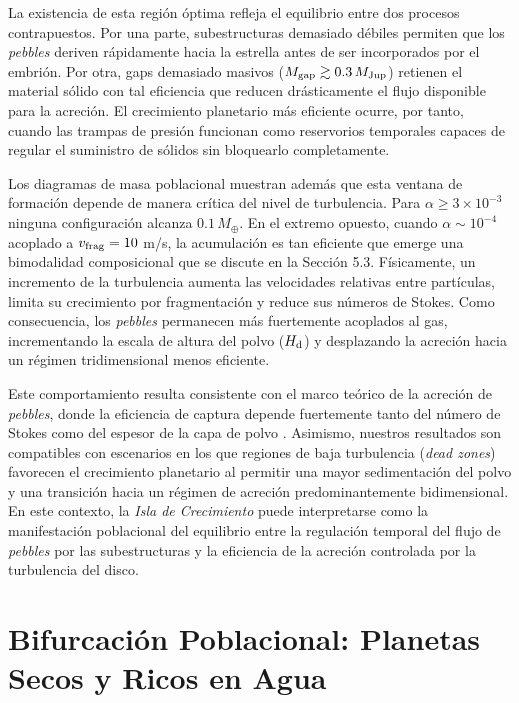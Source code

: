 La existencia de esta región óptima refleja el equilibrio entre dos procesos contrapuestos. Por una parte, subestructuras demasiado débiles permiten que los \textit{pebbles} deriven rápidamente hacia la estrella antes de ser incorporados por el embrión. Por otra, gaps demasiado masivos ($M_{\rm gap}\gtrsim0.3\,M_{\rm Jup}$) retienen el material sólido con tal eficiencia que reducen drásticamente el flujo disponible para la acreción. El crecimiento planetario más eficiente ocurre, por tanto, cuando las trampas de presión funcionan como reservorios temporales capaces de regular el suministro de sólidos sin bloquearlo completamente.

Los diagramas de masa poblacional muestran además que esta ventana de formación depende de manera crítica del nivel de turbulencia. Para $\alpha\ge3\times10^{-3}$ ninguna configuración alcanza $0.1\,M_\oplus$. 
En el extremo opuesto, cuando $\alpha \sim 10^{-4}$ acoplado a $v_{\rm frag} = 10$ m/s, 
la acumulación es tan eficiente que emerge una bimodalidad composicional 
que se discute en la Sección 5.3. Físicamente, un incremento de la turbulencia aumenta las velocidades relativas entre partículas, limita su crecimiento por fragmentación y reduce sus números de Stokes. Como consecuencia, los \textit{pebbles} permanecen más fuertemente acoplados al gas, incrementando la escala de altura del polvo ($H_{\rm d}$) y desplazando la acreción hacia un régimen tridimensional menos eficiente.

Este comportamiento resulta consistente con el marco teórico de la acreción de \textit{pebbles}, donde la eficiencia de captura depende fuertemente tanto del número de Stokes como del espesor de la capa de polvo \citep{Bitsch2015,Ataiee2018}. Asimismo, nuestros resultados son compatibles con escenarios en los que regiones de baja turbulencia (\textit{dead zones}) favorecen el crecimiento planetario al permitir una mayor sedimentación del polvo y una transición hacia un régimen de acreción predominantemente bidimensional. En este contexto, la \textit{Isla de Crecimiento} puede interpretarse como la manifestación poblacional del equilibrio entre la regulación temporal del flujo de \textit{pebbles} por las subestructuras y la eficiencia de la acreción controlada por la turbulencia del disco.


\section{Bifurcación Poblacional: Planetas Secos y Ricos en Agua}

